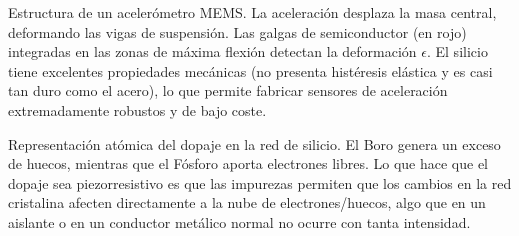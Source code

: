 \begin{marginfigure}
    \caption[Estructura de un acelerómetro MEMS.]{Estructura de un acelerómetro MEMS. La aceleración desplaza la masa central, deformando las vigas de suspensión. Las galgas de semiconductor (en rojo) integradas en las zonas de máxima flexión detectan la deformación $\epsilon$. El silicio tiene excelentes propiedades mecánicas (no presenta histéresis elástica y es casi tan duro como el acero), lo que permite fabricar sensores de aceleración extremadamente robustos y de bajo coste. }\label{fig:mems_acelerometro}
\end{marginfigure}

\begin{marginfigure}
\centering
{}
\caption[Representación atómica del dopaje en la red de silicio]{Representación atómica del dopaje en la red de silicio. El Boro genera un exceso de huecos, mientras que el Fósforo aporta electrones libres. Lo que hace que el dopaje sea piezorresistivo es que las impurezas permiten que los cambios en la red cristalina afecten directamente a la nube de electrones/huecos, algo que en un aislante o en un conductor metálico normal no ocurre con tanta intensidad.}\label{fig:dopaje}
\end{marginfigure}



